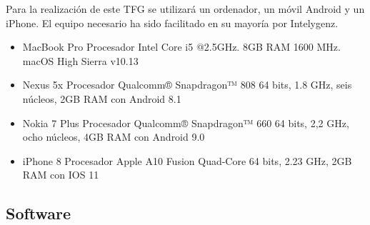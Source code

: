 Para la realización de este TFG se utilizará un ordenador, un móvil Android y un iPhone. El equipo 
necesario ha sido facilitado en su mayoría por Intelygenz.

\begin{itemize}
	\item MacBook Pro Procesador Intel Core i5 @2.5GHz. 8GB RAM 1600 MHz. macOS High Sierra v10.13
	\item Nexus 5x Procesador Qualcomm® Snapdragon™ 808 64 bits, 1.8 GHz, seis núcleos, 2GB RAM con Android 8.1
	\item Nokia 7 Plus Procesador Qualcomm® Snapdragon™ 660 64 bits, 2,2 GHz, ocho núcleos, 4GB RAM con Android 9.0
	\item iPhone 8 Procesador Apple A10 Fusion Quad-Core 64 bits, 2.23 GHz, 2GB RAM con IOS 11
\end{itemize}

\subsection{Software}

